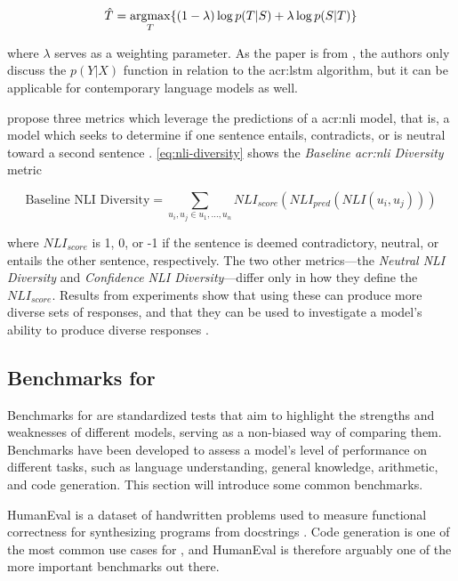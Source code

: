 \begin{equation}
    \hat{T} = \operatorname*{argmax}_{T} \{ (1 - \lambda) \log p(T|S) + \lambda \log p(S|T) \}
\end{equation}

\noindent where $\lambda$ serves as a weighting parameter. As the paper is from \citeyear{liDiversityPromotingObjectiveFunction2016}, the authors only discuss the $p(Y|X)$ function in relation to the \gls{acr:lstm} algorithm, but it can be applicable for contemporary language models as well.

\cite{stasaskiSemanticDiversityDialogue2022} propose three metrics which leverage the predictions of a \gls{acr:nli} model, that is, a model which seeks to determine if one sentence entails, contradicts, or is neutral toward a second  sentence \citep[1]{stasaskiSemanticDiversityDialogue2022}. \eqref{eq:nli-diversity} shows the \textit{Baseline \acrshort{acr:nli} Diversity} metric

\begin{equation}
    \text{Baseline NLI Diversity} = \sum_{u_i,u_j \in u_1,...,u_n} NLI_{score}(NLI_{pred}(NLI(u_i, u_j)))
    \label{eq:nli-diversity}
\end{equation}

\noindent where $NLI_{score}$ is 1, 0, or -1 if the sentence is deemed contradictory, neutral, or entails the other sentence, respectively. The two other metrics---the \textit{Neutral NLI Diversity} and \textit{Confidence NLI Diversity}---differ only in how they define the $NLI_{score}$. Results from experiments show that using these can produce more diverse sets of responses, and that they can be used to investigate a model's ability to produce diverse responses \citep[9]{stasaskiSemanticDiversityDialogue2022}.

\subsection[Benchmarks for LLMs]{Benchmarks for }\label{subsec:benchmarks}

Benchmarks for  are standardized tests that aim to highlight the strengths and weaknesses of different models, serving as a non-biased way of comparing them. Benchmarks have been developed to assess a model's level of performance on different tasks, such as language understanding, general knowledge, arithmetic, and code generation. This section will introduce some common benchmarks.

HumanEval is a dataset of handwritten problems used to measure functional correctness for synthesizing programs from docstrings \citep[2-4]{chenEvaluatingLargeLanguage2021}. Code generation is one of the most common use cases for , and HumanEval is therefore arguably one of the more important benchmarks out there.

